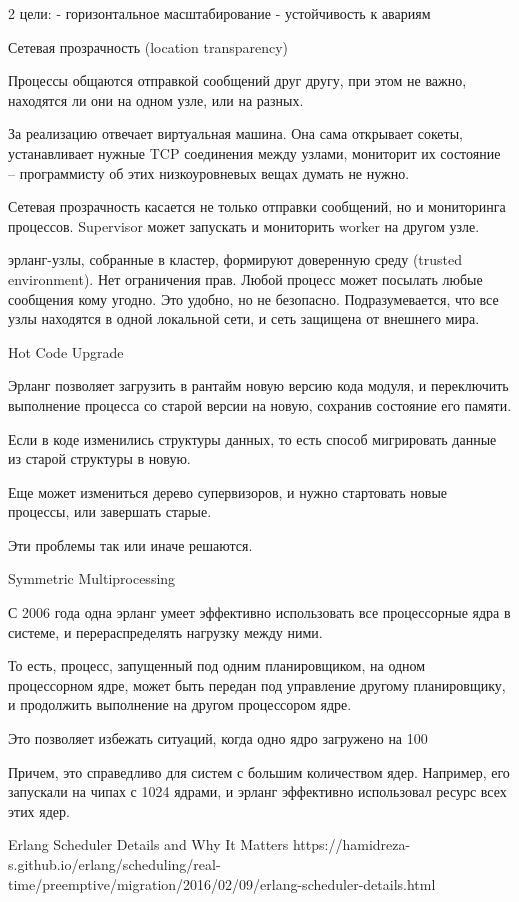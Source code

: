 \documentclass[10pt]{beamer}
\begin{document}
2 цели:
- горизонтальное масштабирование
- устойчивость к авариям

Сетевая прозрачность (location transparency)

Процессы общаются отправкой сообщений друг другу, при этом не важно,
находятся ли они на одном узле, или на разных.

За реализацию отвечает виртуальная машина. Она сама открывает сокеты,
устанавливает нужные TCP соединения между узлами, мониторит их
состояние – программисту об этих низкоуровневых вещах думать не нужно.

Сетевая прозрачность касается не только отправки сообщений, но и мониторинга процессов.
Supervisor может запускать и мониторить worker на другом узле.

эрланг-узлы, собранные в кластер, формируют доверенную среду (trusted environment).
Нет ограничения прав. Любой процесс может посылать любые сообщения кому угодно.
Это удобно, но не безопасно.
Подразумевается, что все узлы находятся в одной локальной сети,
и сеть защищена от внешнего мира.


Hot Code Upgrade

Эрланг позволяет загрузить в рантайм новую версию кода модуля,
и переключить выполнение процесса со старой версии на новую,
сохранив состояние его памяти.

Если в коде изменились структуры данных,
то есть способ мигрировать данные из старой структуры в новую.

Еще может измениться дерево супервизоров, и нужно стартовать новые процессы,
или завершать старые.

Эти проблемы так или иначе решаются.


Symmetric Multiprocessing

С 2006 года одна эрланг умеет эффективно использовать все процессорные ядра в системе,
и перераспределять нагрузку между ними.

То есть, процесс, запущенный под одним планировщиком, на одном процессорном ядре, может быть
передан под управление другому планировщику, и продолжить выполнение на другом процессором ядре.

Это позволяет избежать ситуаций, когда одно ядро загружено на 100%

Причем, это справедливо для систем с большим количеством ядер. Например, его запускали
на чипах с 1024 ядрами, и эрланг эффективно использовал ресурс всех этих ядер.

Erlang Scheduler Details and Why It Matters
https://hamidreza-s.github.io/erlang/scheduling/real-time/preemptive/migration/2016/02/09/erlang-scheduler-details.html
\end{document}
